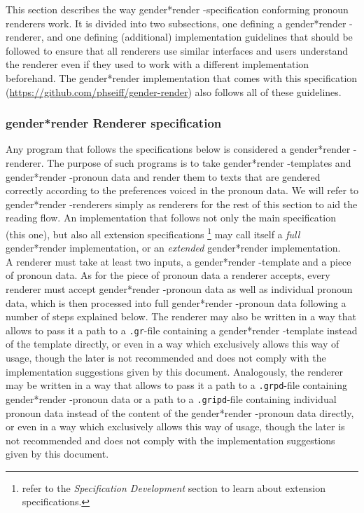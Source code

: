 \documentclass{article}
\newcommand{\GenderRender}{
    gender*render
}
\begin{document}
    This section describes the way \GenderRender-specification conforming pronoun renderers work.
    It is divided into two subsections, one defining a \GenderRender-renderer, and one defining (additional) implementation guidelines that should be followed to ensure that all renderers use similar interfaces and users understand the renderer even if they used to work with a different implementation beforehand.
    The \GenderRender implementation that comes with this specification (\url{https://github.com/phseiff/gender-render}) also follows all of these guidelines.

    \subsubsection{\GenderRender Renderer specification}

    Any program that follows the specifications below is considered a \GenderRender-renderer.
    The purpose of such programs is to take \GenderRender-templates and \GenderRender-pronoun data and render them to texts that are gendered correctly according to the preferences voiced in the pronoun data.
    We will refer to \GenderRender-renderers simply as renderers for the rest of this section to aid the reading flow.
    An implementation that follows not only the main specification (this one), but also all extension specifications \footnote{refer to the \emph{Specification Development} section to learn about extension specifications.} may call itself a \emph{full} \GenderRender implementation, or an \emph{extended} \GenderRender implementation.\\

    A renderer must take at least two inputs, a \GenderRender-template and a piece of pronoun data.
    As for the piece of pronoun data a renderer accepts, every renderer must accept \GenderRender-pronoun data as well as individual pronoun data, which is then processed into full \GenderRender-pronoun data following a number of steps explained below.
    The renderer may also be written in a way that allows to pass it a path to a \texttt{.gr}-file containing a \GenderRender-template instead of the template directly, or even in a way which exclusively allows this way of usage, though the later is not recommended and does not comply with the implementation suggestions given by this document.
    Analogously, the renderer may be written in a way that allows to pass it a path to a \texttt{.grpd}-file containing \GenderRender-pronoun data or a path to a \texttt{.gripd}-file containing individual pronoun data instead of the content of the \GenderRender-pronoun data directly, or even in a way which exclusively allows this way of usage, though the later is not recommended and does not comply with the implementation suggestions given by this document.\\
\end{document}
